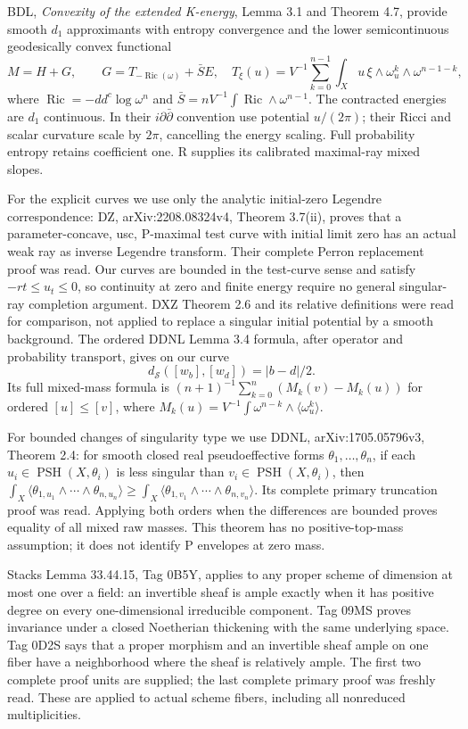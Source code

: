 \documentclass[
  11pt,
]{article}
\begin{document}
BDL, \emph{Convexity of the extended K-energy}, Lemma 3.1 and Theorem
4.7, provide smooth \(d_1\) approximants with entropy convergence and
the lower semicontinuous geodesically convex functional \[
 M=H+G,\qquad G=T_{-\operatorname{Ric}(\omega)}+\bar S E,
 \quad T_\xi(u)=V^{-1}\sum_{k=0}^{n-1}
       \int_Xu\,\xi\wedge\omega_u^k\wedge\omega^{n-1-k},
\] where \(\operatorname{Ric}=-dd^c\log\omega^n\) and
\(\bar S=nV^{-1}\int\operatorname{Ric}\wedge\omega^{n-1}\). The
contracted energies are \(d_1\) continuous. In their
\(i\partial\bar\partial\) convention use potential \(u/(2\pi)\); their
Ricci and scalar curvature scale by \(2\pi\), cancelling the energy
scaling. Full probability entropy retains coefficient one. R supplies
its calibrated maximal-ray mixed slopes.

For the explicit curves we use only the analytic initial-zero Legendre
correspondence: DZ, arXiv:2208.08324v4, Theorem 3.7(ii), proves that a
parameter-concave, usc, P-maximal test curve with initial limit zero has
an actual weak ray as inverse Legendre transform. Their complete Perron
replacement proof was read. Our curves are bounded in the test-curve
sense and satisfy \(-rt\leq u_t\leq0\), so continuity at zero and finite
energy require no general singular-ray completion argument. DXZ Theorem
2.6 and its relative definitions were read for comparison, not applied
to replace a singular initial potential by a smooth background. The
ordered DDNL Lemma 3.4 formula, after operator and probability
transport, gives on our curve
\[ d_{\mathcal S}([w_b],[w_d])=|b-d|/2. \tag{3.2}\] Its full mixed-mass
formula is \((n+1)^{-1}\sum_{k=0}^n(M_k(v)-M_k(u))\) for ordered
\([u]\leq[v]\), where
\(M_k(u)=V^{-1}\int\omega^{n-k}\wedge\langle\omega_u^k\rangle\).

For bounded changes of singularity type we use DDNL, arXiv:1705.05796v3,
Theorem 2.4: for smooth closed real pseudoeffective forms
\(\theta_1,\ldots,\theta_n\), if each
\(u_i\in\operatorname{PSH}(X,\theta_i)\) is less singular than
\(v_i\in\operatorname{PSH}(X,\theta_i)\), then
\(\int_X\langle\theta_{1,u_1}\wedge\cdots\wedge\theta_{n,u_n}\rangle
\geq\int_X\langle\theta_{1,v_1}\wedge\cdots\wedge\theta_{n,v_n}\rangle\).
Its complete primary truncation proof was read. Applying both orders
when the differences are bounded proves equality of all mixed raw
masses. This theorem has no positive-top-mass assumption; it does not
identify P envelopes at zero mass.

Stacks Lemma 33.44.15, Tag 0B5Y, applies to any proper scheme of
dimension at most one over a field: an invertible sheaf is ample exactly
when it has positive degree on every one-dimensional irreducible
component. Tag 09MS proves invariance under a closed Noetherian
thickening with the same underlying space. Tag 0D2S says that a proper
morphism and an invertible sheaf ample on one fiber have a neighborhood
where the sheaf is relatively ample. The first two complete proof units
are supplied; the last complete primary proof was freshly read. These
are applied to actual scheme fibers, including all nonreduced
multiplicities.
\end{document}
